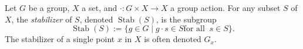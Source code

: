 \documentclass[12pt]{article}
\begin{document}
Let $G$ be a group, $X$ a set, and $\cdot: G \times X \longrightarrow X$ a group action. For any subset $S$ of $X$, the {\em stabilizer} of $S$, denoted $\operatorname{Stab}(S)$, is the subgroup
$$
\operatorname{Stab}(S) := \{g \in G \mid g\cdot s \in S \text{for all }\ s \in S\}.
$$
The stabilizer of a single point $x$ in $X$ is often denoted $G_x$.
\end{document}
